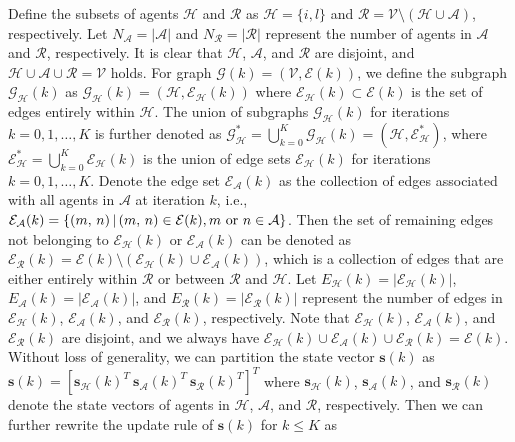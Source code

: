 \documentclass{IEEEtran}
\begin{document}
Define the subsets of agents $\mathcal{H}$ and $\mathcal{R}$ as $\mathcal{H}=\{i,l\}$ and $\mathcal{R}=\mathcal{V}\setminus (\mathcal{H}\cup\mathcal{A})$, respectively. Let $N_{\mathcal{A}}=|\mathcal{A}|$ and $N_{\mathcal{R}}=|\mathcal{R}|$ represent the number of agents in $\mathcal{A}$ and $\mathcal{R}$, respectively. It is clear that $\mathcal{H}$, $\mathcal{A}$, and $\mathcal{R}$ are disjoint, and $\mathcal{H} \cup \mathcal{A} \cup \mathcal{R} = \mathcal{V}$ holds. For graph $\mathcal{G}(k)=(\mathcal{V},\mathcal{E}(k))$, we define the subgraph $\mathcal{G_H}(k)$ as $\mathcal{G_H}(k)=(\mathcal{H},\mathcal{E_H}(k))$ where $\mathcal{E_H}(k) \subset \mathcal{E}(k)$ is the set of edges entirely within $\mathcal{H}$. The union of subgraphs $\mathcal{G_H}(k)$ for iterations $k=0,1,\ldots, K$ is further denoted as $\mathcal{G}_{\mathcal{H}}^*= \bigcup\limits_{k=0}^K \mathcal{G_H}(k) = (\mathcal{H}, \mathcal{E}_{\mathcal{H}}^*)$, where $\mathcal{E}_{\mathcal{H}}^*=\bigcup\limits_{k=0}^K \mathcal{E_H}(k)$ is the union of edge sets $\mathcal{E_H}(k)$ for iterations $k=0,1,\ldots, K$. Denote the edge set $\mathcal{E_A}(k)$ as the collection of edges associated with all agents in $\mathcal{A}$ at iteration $k$, i.e., $\mathcal{E_A}(k)=\{(m,\,n) \, | \, (m,\,n) \in \mathcal{E}(k), m \ \textnormal{or} \ n \in \mathcal{A}\}$. Then the set of remaining edges not belonging to $\mathcal{E_H}(k)$ or $\mathcal{E_A}(k)$ can be denoted as $\mathcal{E_R}(k)=\mathcal{E}(k)\setminus (\mathcal{E_H}(k) \cup \mathcal{E_A}(k))$, which is a collection of edges that are either entirely within $\mathcal{R}$ or between $\mathcal{R}$ and $\mathcal{H}$. Let $E_{\mathcal{H}}(k)=|\mathcal{E_H}(k)|$, $E_{\mathcal{A}}(k)=|\mathcal{E_A}(k)|$, and $E_{\mathcal{R}}(k)=|\mathcal{E_R}(k)|$ represent the number of edges in $\mathcal{E_H}(k)$, $\mathcal{E_A}(k)$, and $\mathcal{E_R}(k)$, respectively. Note that $\mathcal{E_H}(k)$, $\mathcal{E_A}(k)$, and $\mathcal{E_R}(k)$ are disjoint, and we always have $\mathcal{E_H}(k) \cup \mathcal{E_A}(k) \cup \mathcal{E_R}(k) = \mathcal{E}(k)$. Without loss of generality, we can partition the state vector $\mathbf{s}(k)$ as $\mathbf{s}(k)=[\mathbf{s}_{\mathcal{H}}(k)^T \ \mathbf{s}_{\mathcal{A}}(k)^T \ \mathbf{s}_{\mathcal{R}}(k)^T]^T$ where $\mathbf{s}_{\mathcal{H}}(k)$, $\mathbf{s}_{\mathcal{A}}(k)$, and $\mathbf{s}_{\mathcal{R}}(k)$ denote the state vectors of agents in $\mathcal{H}$, $\mathcal{A}$, and $\mathcal{R}$, respectively. Then we can further rewrite the update rule of $\mathbf{s}(k)$ for $k \leq K$ as
\end{document}
